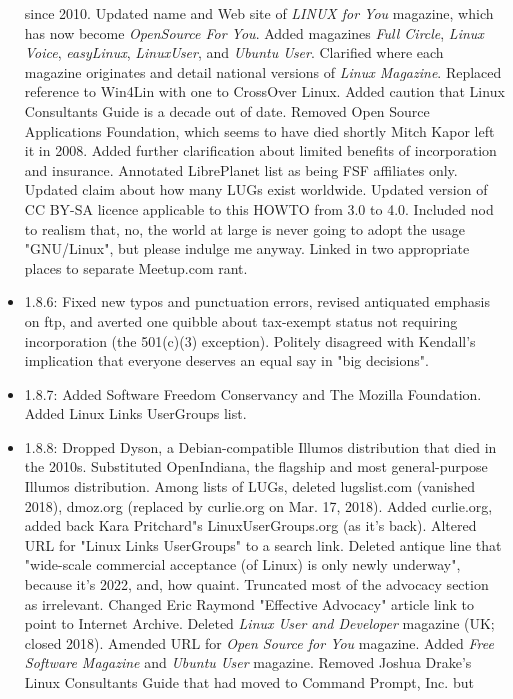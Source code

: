 \begin{itemize}
since 2010.  Updated name and Web site of {\itshape LINUX for You\/} magazine, which has now become {\itshape OpenSource For You\/}.
Added magazines {\itshape Full Circle\/}, {\itshape Linux Voice\/},
{\itshape easyLinux\/}, {\itshape LinuxUser\/}, and {\itshape Ubuntu User\/}.
Clarified where each magazine originates and detail national versions of
{\itshape Linux Magazine\/}.  Replaced reference to Win4Lin with one to CrossOver
Linux.  Added caution that Linux Consultants Guide is a decade out of
date.  Removed Open Source Applications Foundation, which seems to have
died shortly Mitch Kapor left it in 2008.  Added further clarification 
about limited benefits of incorporation and insurance.  Annotated LibrePlanet 
list as being FSF affiliates only.  Updated claim about how many LUGs 
exist worldwide.  Updated version of CC BY-SA licence applicable to this 
HOWTO from 3.0 to 4.0.  Included nod to realism that, no, the world at large
is never going to adopt the usage "GNU/Linux", but please indulge me anyway.
Linked in two appropriate places to separate Meetup.com rant.
\item 1.8.6:  Fixed new typos and punctuation errors, revised antiquated emphasis on ftp, and averted one quibble about tax-exempt status not requiring incorporation (the 501(c)(3) exception).  Politely disagreed with Kendall's implication that everyone deserves an equal say in "big decisions".
\item 1.8.7:  Added Software Freedom Conservancy and The Mozilla
Foundation.  Added Linux Links UserGroups list.
\item 1.8.8:  Dropped Dyson, a Debian-compatible Illumos
distribution that died in the 2010s.  Substituted OpenIndiana, the
flagship and most general-purpose Illumos distribution.  Among lists of
LUGs, deleted lugslist.com (vanished 2018), dmoz.org (replaced by
curlie.org on Mar. 17, 2018).  Added curlie.org, added back Kara Pritchard"s 
LinuxUserGroups.org (as it's back).  Altered URL for "Linux Links
UserGroups" to a search link.  Deleted antique line that "wide-scale commercial acceptance 
(of Linux) is only newly underway", because it's 2022, and, how quaint.  Truncated most 
of the advocacy section as irrelevant.  Changed Eric Raymond "Effective Advocacy" article 
link to point to Internet Archive.
Deleted {\itshape Linux User and Developer\/} magazine (UK; closed 2018). Amended URL for 
{\itshape Open Source for You\/} magazine.  Added {\itshape Free Software Magazine\/} and 
{\itshape Ubuntu User\/} magazine.  Removed 
Joshua Drake's Linux Consultants Guide that had moved to Command Prompt, Inc. but

\end{itemize}
